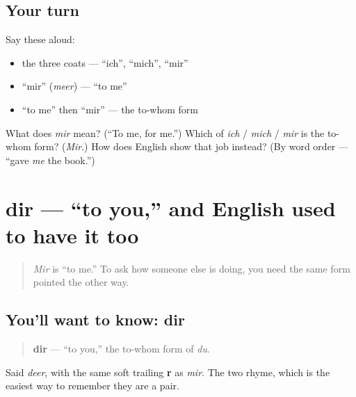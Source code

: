 \subsection*{Your turn}
Say these aloud:

\begin{itemize}
\raggedright
  \item the three coats — \textquotedblleft{}ich\textquotedblright{}, \textquotedblleft{}mich\textquotedblright{}, \textquotedblleft{}mir\textquotedblright{}
  \item \textquotedblleft{}mir\textquotedblright{} (\emph{meer}) — \textquotedblleft{}to me\textquotedblright{}
  \item \textquotedblleft{}to me\textquotedblright{} then \textquotedblleft{}mir\textquotedblright{} — the to-whom form
\end{itemize}

\begin{tcolorbox}[breakable,colback=teal!4,colframe=teal!35!black,title={Before you move on}]
What does \emph{mir} mean? (\textquotedblleft{}To me, for me.\textquotedblright{}) Which of \emph{ich} / \emph{mich} / \emph{mir} is the to-whom form? (\emph{Mir}.) How does English show that job instead? (By word order — \textquotedblleft{}gave \emph{me} the book.\textquotedblright{})
\end{tcolorbox}
\section[dir]{dir — \textquotedblleft{}to you,\textquotedblright{} and English used to have it too}

\label{lesson:GE-C03-dir}



\begin{quote}
\emph{Mir} is \textquotedblleft{}to me.\textquotedblright{} To ask how someone else is doing, you need the same form pointed the other way.
\end{quote}

\subsection*{You'll want to know: dir}
\begin{quote}
\textbf{dir} — \textquotedblleft{}to you,\textquotedblright{} the to-whom form of \emph{du}.
\end{quote}

Said \emph{deer}, with the same soft trailing \textbf{r} as \emph{mir}. The two rhyme, which is the easiest way to remember they are a pair.

